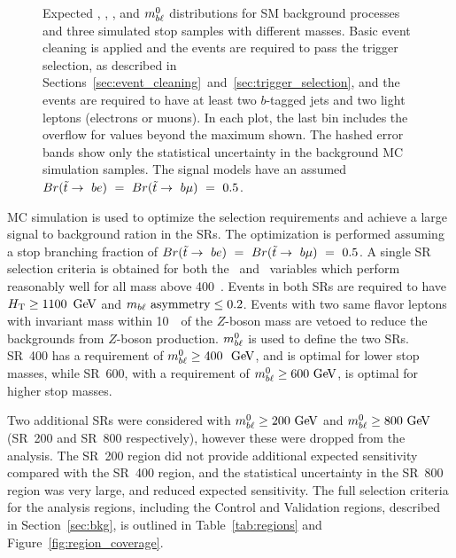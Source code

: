 \begin{figure}
{  }
  \caption{Expected \MLL, \HT, \MBLASYM, and $m_{b\ell}^0$ distributions for SM
    background processes and three simulated stop samples with different masses.
    Basic event cleaning is applied and the events are required to pass the
    trigger selection, as described in
    Sections~\ref{sec:event_cleaning}~and~\ref{sec:trigger_selection}, and the
    events are required to have at least two $b$-tagged jets and two light
    leptons (electrons or muons).
    In each plot, the last bin includes the overflow for values beyond the
    maximum shown. The hashed error bands show only the statistical
    uncertainty in the background MC simulation samples. The signal
    models have an assumed
    $Br(\tilde{t}\rightarrow~be)~=~Br(\tilde{t}\rightarrow~b\mu)~=~0.5$.
  }
  \label{fig:no_data__no_k__inclusive_flavor_all__kinematic_dists}
\end{figure}

MC simulation is used to optimize the selection requirements and achieve a
large signal to background ration in the SRs.
The optimization is performed assuming a stop branching fraction of
$Br(\tilde{t}\rightarrow~be)~=~Br(\tilde{t}\rightarrow~b\mu)~=~0.5$.
A single SR selection criteria is obtained for both the \HT\ and
\MBLASYM\ variables which perform reasonably well for all mass above 400~\GeV.
Events in both SRs are required to have $\HT \geq 1100\,\GeV$ and
$m_{b\ell}~\mathrm{asymmetry} \leq 0.2$.
Events with two same flavor leptons with invariant mass within 10~\GeV\ of the
$Z$-boson mass are vetoed to reduce the backgrounds from $Z$-boson production.
$m_{b\ell}^0$ is used to define the two SRs.
SR~400 has a requirement of $\MBL^0 \geq 400~\GeV$, and is optimal for lower
stop masses, while SR~600, with a requirement of $\MBL^0 \geq 600 \GeV$, is
optimal for higher stop masses.

Two additional SRs were considered with $\MBL^0 \geq 200 \GeV$ and
$\MBL^0 \geq 800 \GeV$ (SR~200 and SR~800 respectively), however these were
dropped from the analysis.
The SR~200 region did not provide additional expected sensitivity compared with
the SR~400 region, and the statistical uncertainty in the SR~800 region was very
large, and reduced expected sensitivity.
The full selection criteria for the analysis regions, including the Control and
Validation regions, described in Section~\ref{sec:bkg}, is outlined in
Table~\ref{tab:regions} and Figure~\ref{fig:region_coverage}.

